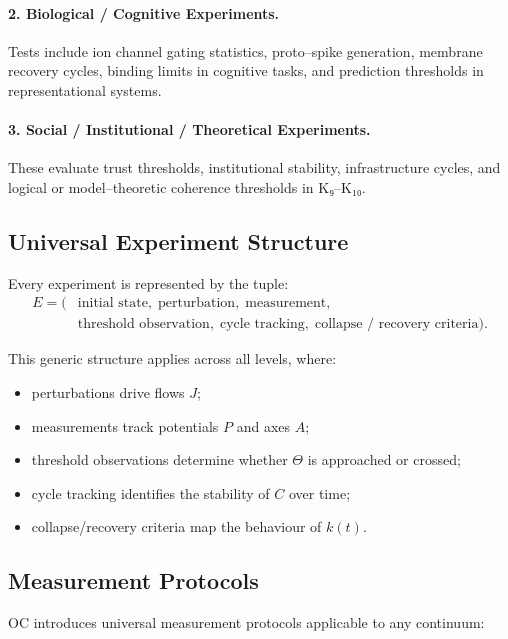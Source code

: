 \paragraph{2. Biological / Cognitive Experiments.}  
Tests include ion channel gating statistics, proto–spike generation,
membrane recovery cycles, binding limits in cognitive tasks, and prediction
thresholds in representational systems.

\paragraph{3. Social / Institutional / Theoretical Experiments.}  
These evaluate trust thresholds, institutional stability, infrastructure
cycles, and logical or model–theoretic coherence thresholds in K₉–K₁₀.


\subsection{Universal Experiment Structure}

Every experiment is represented by the tuple:
\[
\begin{aligned}
   E = (&\text{initial state},\;
         \text{perturbation},\;
         \text{measurement},\\
        &\text{threshold observation},\;
         \text{cycle tracking},\;
         \text{collapse / recovery criteria}).
\end{aligned}
\]

This generic structure applies across all levels, where:

\begin{itemize}
    \item perturbations drive flows $J$;
    \item measurements track potentials $P$ and axes $A$;
    \item threshold observations determine whether $\Theta$ is approached or
          crossed;
    \item cycle tracking identifies the stability of $C$ over time;
    \item collapse/recovery criteria map the behaviour of $k(t)$.
\end{itemize}


\subsection{Measurement Protocols}

OC introduces universal measurement protocols applicable to any continuum:


